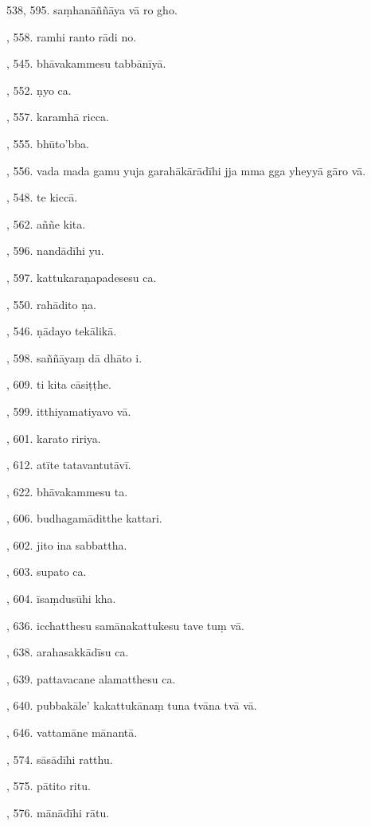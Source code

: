 538, 595. saṃhanāññāya vā ro gho.\par {}, 558. ramhi ranto rādi no.\par {}, 545. bhāvakammesu tabbānīyā.\par {}, 552. ṇyo ca.\par {}, 557. karamhā ricca.\par {}, 555. bhūto’bba.\par {}, 556. vada mada gamu yuja garahākārādīhi jja mma gga yheyyā gāro vā.\par {}, 548. te kiccā.\par {}, 562. aññe kita.\par {}, 596. nandādīhi yu.\par {}, 597. kattukaraṇapadesesu ca.\par {}, 550. rahādito ṇa.\par {}, 546. ṇādayo tekālikā.\par {}, 598. saññāyaṃ dā dhāto i.\par {}, 609. ti kita cāsiṭṭhe.\par {}, 599. itthiyamatiyavo vā.\par {}, 601. karato ririya.\par {}, 612. atīte tatavantutāvī.\par {}, 622. bhāvakammesu ta.\par {}, 606. budhagamāditthe kattari.\par {}, 602. jito ina sabbattha.\par {}, 603. supato ca.\par {}, 604. īsaṃdusūhi kha.\par {}, 636. icchatthesu samānakattukesu tave tuṃ vā.\par {}, 638. arahasakkādīsu ca.\par {}, 639. pattavacane alamatthesu ca.\par {}, 640. pubbakāle’ kakattukānaṃ tuna tvāna tvā vā.\par {}, 646. vattamāne mānantā.\par {}, 574. sāsādīhi ratthu.\par {}, 575. pātito ritu.\par {}, 576. mānādīhi rātu.\par \noindent
